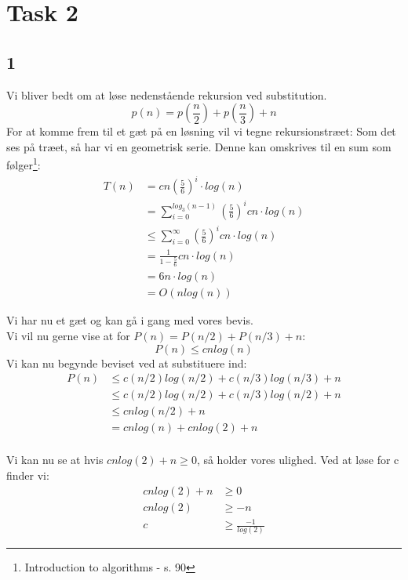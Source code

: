 \section{Task 2}

\subsection{1}
Vi bliver bedt om at løse nedenstående rekursion ved substitution.
\begin{equation*}
	p(n) = p(\frac{n}{2}) + p(\frac{n}{3}) + n
\end{equation*}
For at komme frem til et gæt på en løsning vil vi tegne rekursionstræet:
Som det ses på træet, så har vi en geometrisk serie. Denne kan omskrives til en sum som følger\footnote{Introduction to algorithms - s. 90}:
\begin{align*}
	T(n) &= cn\left(\frac{5}{6}\right)^i \cdot log(n)\\
	&= \sum_{i = 0}^{log_{3}(n-1)}\left(\frac{5}{6}\right)^icn \cdot log(n)\\
	&\leq \sum_{i = 0}^{\infty}\left(\frac{5}{6}\right)^icn \cdot log(n)\\
	&= \frac{1}{1-\frac{5}{6}}cn \cdot log(n)\\
	&= 6n\cdot log(n)\\
	&= O(nlog(n))
\end{align*}

Vi har nu et gæt og kan gå i gang med vores bevis.\\
Vi vil nu gerne vise at for $P(n) = P(n/2) + P(n/3) + n$:
\begin{equation*}
	P(n) \leq cnlog(n)
\end{equation*}
Vi kan nu begynde beviset ved at substituere ind:
\begin{align*}
	P(n) &\leq c(n/2)log(n/2) + c(n/3)log(n/3) + n\\
	&\leq c(n/2)log(n/2) + c(n/3)log(n/2) + n\\
	&\leq cnlog(n/2) + n\\
	&= cnlog(n) + cnlog(2) + n\\
\end{align*}

Vi kan nu se at hvis $cnlog(2) + n \geq 0$, så holder vores ulighed. Ved at løse for c finder vi:
\begin{align*}
	cnlog(2) + n &\geq 0\\
	cnlog(2) &\geq -n\\
	c &\geq \frac{-1}{log(2)}
\end{align*}

